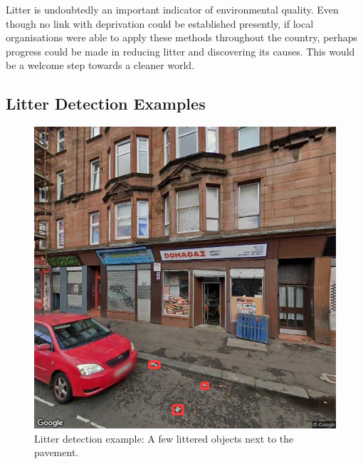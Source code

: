 \documentclass{thesis}
\begin{document}
Litter is undoubtedly an important indicator of environmental quality\cite{household-survey-2019}. Even though no link with deprivation could be established presently, if local organisations were able to apply these methods throughout the country, perhaps progress could be made in reducing litter and discovering its causes. This would be a welcome step towards a cleaner world.


\begin{appendices}

\chapter{Litter Detection Examples}

\begin{figure}[h!]
    \centering
    \includegraphics[scale=0.5]{images/good-three.jpg}
    \caption{Litter detection example: A few littered objects next to the pavement.}
\end{figure}


\end{appendices}
\end{document}
